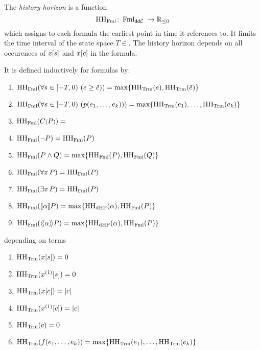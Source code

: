         \begin{definition}
            The \emph{history horizon} is a function
            \begin{equation*}
                \operatorname{HH_{\operatorname{Fml}}}\colon \operatorname{Fml}_{\textsf{dd{\kern-0.1em}$\mathcal{L}$ }} \to \mathbb{R}_{\leq 0}
            \end{equation*}
            which assigns to each \ddL formula the earliest point in time it references to. It limits the time interval of the state space $T\in$.
            The history horizon depends on all occurences of $x[s]$ and $x[c]$ in the formula.

            It is defined inductively for formulas by:
            \begin{enumerate}
                \item $\HHfml(\holdssince{T}{\astrm\geq\bstrm}) = \max\set{\HHtrm(\astrm),\HHtrm(\bstrm)}$
                \item $\HHfml(\holdssince{T}{p(\range{\istrm{1}}{\istrm{k}})}) = \max\set{\range{\HHtrm(\istrm{1})}{\HHtrm(\istrm{k})}}$
                \item $\operatorname{HH_{\operatorname{Fml}}}(C\text{\footnotesize$($}P\text{\footnotesize$)$}) = $
                \item $\operatorname{HH_{\operatorname{Fml}}}(\lnot P) = \operatorname{HH_{\operatorname{Fml}}}(P)$
                \item $\HHfml(\asfml\land\bsfml) = \max\set{\HHfml(\asfml),\HHfml(\bsfml)}$
                \item $\operatorname{HH_{\operatorname{Fml}}}(\forall x{\,} P) = \operatorname{HH_{\operatorname{Fml}}}(P)$
                \item $\operatorname{HH_{\operatorname{Fml}}}(\exists x{\,} P) = \operatorname{HH_{\operatorname{Fml}}}(P)$
                \item $\HHfml(\dbox{\asprg}{\asfml}) = \max\set{\HHprg(\asprg),\HHfml(\asfml)}$
                \item $\HHfml(\ddiamond{\asprg}{\asfml}) = \max\set{\HHprg(\asprg),\HHfml(\asfml)}$
            \end{enumerate}
            depending on terms
            \begin{enumerate}
                \item $\operatorname{HH_{\operatorname{Trm}}}(x[s]) = 0$
                \item $\HHtrm(\Dxtau[s]) = 0$
                \item $\operatorname{HH_{\operatorname{Trm}}}(x[c]) = \lvert c\rvert$
                \item $\HHtrm(\Dxtau[c]) = \abs{c}$
                \item $\operatorname{HH_{\operatorname{Trm}}}(c) = 0$
                \item $\HHtrm(f(\range{\istrm{1}}{\istrm{k}})) = \max\set{\range{\HHtrm(\istrm{1})}{\HHtrm(\istrm{k})}}$

\end{enumerate}
\end{definition}
